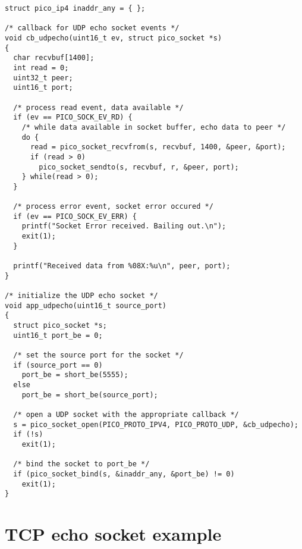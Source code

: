 \begin{verbatim}
struct pico_ip4 inaddr_any = { };

/* callback for UDP echo socket events */
void cb_udpecho(uint16_t ev, struct pico_socket *s)
{
  char recvbuf[1400];
  int read = 0;
  uint32_t peer;
  uint16_t port;

  /* process read event, data available */
  if (ev == PICO_SOCK_EV_RD) {
  	/* while data available in socket buffer, echo data to peer */
    do {
      read = pico_socket_recvfrom(s, recvbuf, 1400, &peer, &port);
      if (read > 0)
        pico_socket_sendto(s, recvbuf, r, &peer, port);
    } while(read > 0);
  }

  /* process error event, socket error occured */
  if (ev == PICO_SOCK_EV_ERR) {
    printf("Socket Error received. Bailing out.\n");
    exit(1);
  }

  printf("Received data from %08X:%u\n", peer, port);
}

/* initialize the UDP echo socket */
void app_udpecho(uint16_t source_port)
{
  struct pico_socket *s;
  uint16_t port_be = 0;
  
  /* set the source port for the socket */
  if (source_port == 0)
    port_be = short_be(5555);
  else
    port_be = short_be(source_port);

  /* open a UDP socket with the appropriate callback */
  s = pico_socket_open(PICO_PROTO_IPV4, PICO_PROTO_UDP, &cb_udpecho);
  if (!s)
    exit(1);

  /* bind the socket to port_be */
  if (pico_socket_bind(s, &inaddr_any, &port_be) != 0)
    exit(1);
}
\end{verbatim}


\section{TCP echo socket example}

